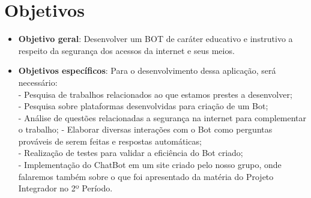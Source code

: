 \section{Objetivos}
\label{objetivos}


\begin{itemize}
		\item \textbf{Objetivo geral}: Desenvolver um BOT de caráter educativo e instrutivo a respeito da segurança dos acessos da internet e seus meios.
		
		\item \textbf{Objetivos específicos}: Para o desenvolvimento dessa aplicação, será necessário: \\ 
		- Pesquisa de trabalhos relacionados ao que estamos prestes a desenvolver; \\
		- Pesquisa sobre plataformas desenvolvidas para criação de um Bot; \\
		- Análise de questões relacionadas a segurança na internet para complementar o trabalho;
		- Elaborar diversas interações com o Bot como perguntas prováveis de serem feitas e respostas automáticas; \\
		- Realização de testes para validar a eficiência do Bot criado; \\
		- Implementação do ChatBot em um site criado pelo nosso grupo, onde falaremos também sobre o que foi apresentado da matéria do Projeto Integrador no 2º Período.
		
		
\end{itemize}
